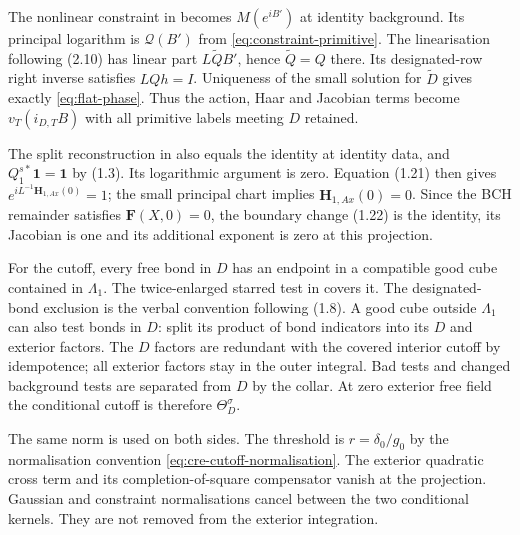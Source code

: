 \documentclass[11pt]{article}
\newcommand{\id}{\mathbf 1}
\begin{document}
The nonlinear constraint in \cite[(2.4)]{BalabanRG1} becomes $M(e^{iB'})$ at identity background. Its principal logarithm is $\mathcal Q(B')$ from \eqref{eq:constraint-primitive}. The linearisation following (2.10) has linear part $L\widetilde Q B'$, hence $\widetilde Q=Q$ there. Its designated-row right inverse satisfies $LQh=I$. Uniqueness of the small solution for $\widetilde D$ gives exactly \eqref{eq:flat-phase}. Thus the action, Haar and Jacobian terms become $v_T(i_{D,T}B)$ with all primitive labels meeting $D$ retained.

The split reconstruction in \cite[(1.21)]{BalabanCRE} also equals the identity at identity data, and $Q_1^{s*}\id=\id$ by (1.3). Its logarithmic argument is zero. Equation (1.21) then gives $e^{iL^{-1}\mathbf H_{1,Ax}(0)}=1$; the small principal chart implies $\mathbf H_{1,Ax}(0)=0$. Since the BCH remainder satisfies $\mathbf F(X,0)=0$, the boundary change (1.22) is the identity, its Jacobian is one and its additional exponent is zero at this projection.

For the cutoff, every free bond in $D$ has an endpoint in a compatible good cube contained in $\Lambda_1$. The twice-enlarged starred test in \cite[(1.18)]{BalabanCRE} covers it. The designated-bond exclusion is the verbal convention following (1.8). A good cube outside $\Lambda_1$ can also test bonds in $D$: split its product of bond indicators into its $D$ and exterior factors. The $D$ factors are redundant with the covered interior cutoff by idempotence; all exterior factors stay in the outer integral. Bad tests and changed background tests are separated from $D$ by the collar. At zero exterior free field the conditional cutoff is therefore $\Theta_D^\sigma$.

The same norm is used on both sides. The threshold is $r=\delta_0/g_0$ by the normalisation convention \eqref{eq:cre-cutoff-normalisation}. The exterior quadratic cross term and its completion-of-square compensator vanish at the projection. Gaussian and constraint normalisations cancel between the two conditional kernels. They are not removed from the exterior integration.
\end{document}
